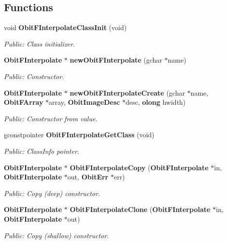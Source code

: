 \subsection*{Functions}
\begin{CompactItemize}
\item 
void {\bf Obit\-FInterpolate\-Class\-Init} (void)
\begin{CompactList}\small\item\em Public: Class initializer. \item\end{CompactList}\item 
{\bf Obit\-FInterpolate} $\ast$ {\bf new\-Obit\-FInterpolate} (gchar $\ast$name)
\begin{CompactList}\small\item\em Public: Constructor. \item\end{CompactList}\item 
{\bf Obit\-FInterpolate} $\ast$ {\bf new\-Obit\-FInterpolate\-Create} (gchar $\ast$name, {\bf Obit\-FArray} $\ast$array, {\bf Obit\-Image\-Desc} $\ast$desc, {\bf olong} hwidth)
\begin{CompactList}\small\item\em Public: Constructor from value. \item\end{CompactList}\item 
gconstpointer {\bf Obit\-FInterpolate\-Get\-Class} (void)
\begin{CompactList}\small\item\em Public: Class\-Info pointer. \item\end{CompactList}\item 
{\bf Obit\-FInterpolate} $\ast$ {\bf Obit\-FInterpolate\-Copy} ({\bf Obit\-FInterpolate} $\ast$in, {\bf Obit\-FInterpolate} $\ast$out, {\bf Obit\-Err} $\ast$err)
\begin{CompactList}\small\item\em Public: Copy (deep) constructor. \item\end{CompactList}\item 
{\bf Obit\-FInterpolate} $\ast$ {\bf Obit\-FInterpolate\-Clone} ({\bf Obit\-FInterpolate} $\ast$in, {\bf Obit\-FInterpolate} $\ast$out)
\begin{CompactList}\small\item\em Public: Copy (shallow) constructor. \item\end{CompactList}\item 

\end{CompactItemize}
